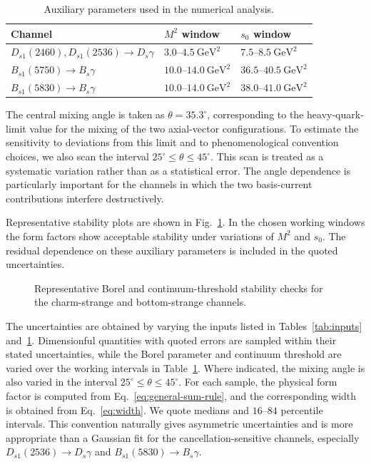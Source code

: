 \documentclass[aps,prd,preprint,nofootinbib,superscriptaddress]{revtex4-2}
\newcommand{\Ds}{D_s}
\newcommand{\Dsone}{D_{s1}}
\newcommand{\Bs}{B_s}
\newcommand{\Bsone}{B_{s1}}
\newcommand{\GeV}{\mathrm{GeV}}
\begin{document}
\begin{table}[t]
\caption{Auxiliary parameters used in the numerical analysis.}
\label{tab:windows}
\begin{ruledtabular}
\begin{tabular}{lll}
Channel & $M^2$ window & $s_0$ window \\
\hline
$\Dsone(2460),\Dsone(2536)\to\Ds\gamma$
& $3.0$--$4.5~\GeV^2$
& $7.5$--$8.5~\GeV^2$ \\
$\Bsone(5750)\to\Bs\gamma$
& $10.0$--$14.0~\GeV^2$
& $36.5$--$40.5~\GeV^2$ \\
$\Bsone(5830)\to\Bs\gamma$
& $10.0$--$14.0~\GeV^2$
& $38.0$--$41.0~\GeV^2$ \\
\end{tabular}
\end{ruledtabular}
\end{table}

The central mixing angle is taken as $\theta=35.3^\circ$, corresponding to the
heavy-quark-limit value for the mixing of the two axial-vector configurations.
To estimate the sensitivity to deviations from this limit and to
phenomenological convention choices, we also scan the interval
$25^\circ\leq\theta\leq45^\circ$.  This scan is treated as a systematic
variation rather than as a statistical error.  The angle dependence is
particularly important for the channels in which the two basis-current
contributions interfere destructively.

Representative stability plots are shown in Fig.~\ref{fig:stability}.  In the
chosen working windows the form factors show acceptable stability under
variations of $M^2$ and $s_0$.  The residual dependence on these auxiliary
parameters is included in the quoted uncertainties.

\begin{figure}[t]
\centering
\caption{Representative Borel and continuum-threshold stability checks for
the charm-strange and bottom-strange channels.}
\label{fig:stability}
\end{figure}

The uncertainties are obtained by varying the inputs listed in
Tables~\ref{tab:inputs} and~\ref{tab:windows}.  Dimensionful quantities with
quoted errors are sampled within their stated uncertainties, while the Borel
parameter and continuum threshold are varied over the working intervals in
Table~\ref{tab:windows}.  Where indicated, the mixing angle is also varied in
the interval $25^\circ\leq\theta\leq45^\circ$.  For each sample, the physical
form factor is computed from Eq.~\eqref{eq:general-sum-rule}, and the
corresponding width is obtained from Eq.~\eqref{eq:width}.  We quote medians
and $16$--$84$ percentile intervals.  This convention naturally gives
asymmetric uncertainties and is more appropriate than a Gaussian fit for the
cancellation-sensitive channels, especially
$\Dsone(2536)\to\Ds\gamma$ and $\Bsone(5830)\to\Bs\gamma$.
\end{document}
